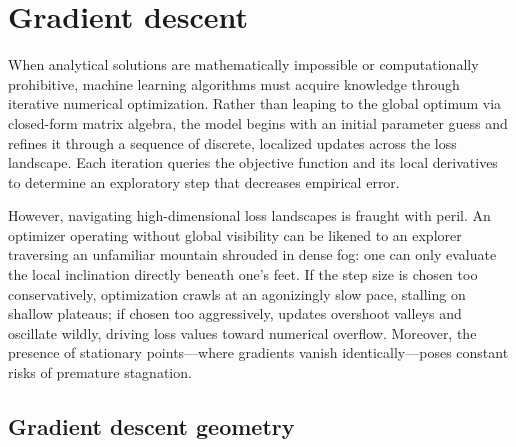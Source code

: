 \section{Gradient descent}
\label{sec:first_order_optimization}

When analytical solutions are mathematically impossible or computationally prohibitive, machine learning algorithms must acquire knowledge through iterative numerical optimization. Rather than leaping to the global optimum via closed-form matrix algebra, the model begins with an initial parameter guess and refines it through a sequence of discrete, localized updates across the loss landscape. Each iteration queries the objective function and its local derivatives to determine an exploratory step that decreases empirical error.

However, navigating high-dimensional loss landscapes is fraught with peril. An optimizer operating without global visibility can be likened to an explorer traversing an unfamiliar mountain shrouded in dense fog: one can only evaluate the local inclination directly beneath one's feet. If the step size is chosen too conservatively, optimization crawls at an agonizingly slow pace, stalling on shallow plateaus; if chosen too aggressively, updates overshoot valleys and oscillate wildly, driving loss values toward numerical overflow. Moreover, the presence of stationary points---where gradients vanish identically---poses constant risks of premature stagnation.

\subsection{Gradient descent geometry}
\label{sec:gd_foundations_topography}
\label{sec:skier_analogy_landscape}
\label{sec:loss_surface_topology}
\label{sec:differentiability_and_orthogonality}

